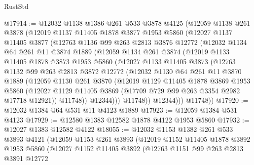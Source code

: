 \begin{lexlean}{RustStd}
\begin{coremodule}
@17914 := @12032
    @1138
    @1386
    @261
    @533
    @3878
    @4125
    (@12059
      @1138
      @261
      @3878
      (@12019
        @1137
        @11405
        @1878
        @3877
        @1953
        @5860
        (@12027
          @1137
          @11405
          @3877
          (@12763
            @1136
            @99
            @263
            @2813
            @3876
            @12772
            (@12032
              @1134
              @64
              @261
              @11
              @3874
              @1889
              (@12059
                @1134
                @261
                @3874
                (@12019
                  @1133
                  @11405
                  @1878
                  @3873
                  @1953
                  @5860
                  (@12027
                    @1133
                    @11405
                    @3873
                    (@12763
                      @1132
                      @99
                      @263
                      @2813
                      @3872
                      @12772
                      (@12032
                        @1130
                        @64
                        @261
                        @11
                        @3870
                        @1889
                        (@12059
                          @1130
                          @261
                          @3870
                          (@12019
                            @1129
                            @11405
                            @1878
                            @3869
                            @1953
                            @5860
                            (@12027
                              @1129
                              @11405
                              @3869
                              (@17709 @729 @99 @263 @3354 @2982 @17718 @12921))
                            @11748))
                        @12344)))
                  @11748))
              @12344)))
        @11748))
@17920 := @12032 @1384 @64 @531 @11 @4123 @1889
@17923 := @12059 @1384 @531 @4123
@17929 := @12580 @1383 @12582 @1878 @4122 @1953 @5860
@17932 := @12027 @1383 @12582 @4122
@18055 := @12032
    @1153
    @1382
    @261
    @533
    @3893
    @4121
    (@12059
      @1153
      @261
      @3893
      (@12019
        @1152
        @11405
        @1878
        @3892
        @1953
        @5860
        (@12027
          @1152
          @11405
          @3892
          (@12763
            @1151
            @99
            @263
            @2813
            @3891
            @12772

\end{coremodule}
\end{lexlean}
